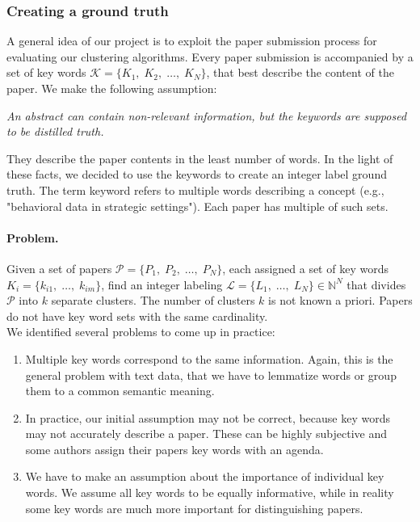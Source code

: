 \subsubsection{Creating a ground truth}
\label{sec:create_gt}
A general idea of our project is to exploit the paper submission process for evaluating our clustering algorithms. Every paper submission is accompanied by a set of key words $ \mathcal{K} = \{ K_{1},\; K_{2},\; \dots ,\; K_{N} \} $, that best describe the content of the paper. We make the following assumption: 
\begin{center}
	\textit{An abstract can contain non-relevant information, but the keywords are supposed to be distilled truth.}
\end{center}
They describe the paper contents in the least number of words. In the light of these facts, we decided to use the keywords to create an integer label ground truth. 
The term keyword refers to multiple words describing a concept (e.g., "behavioral data in strategic settings"). Each paper has multiple of such sets.

\paragraph{Problem.} Given a set of papers $ \mathcal{P} = \{ P_{1},\; P_{2},\; \dots,\; P_{N} \} $, each assigned a set of key words $ K_{i} = \{ k_{i1},\; \dots ,\; k_{im} \} $, find an integer labeling $ \mathcal{L} = \{ L_{1},\; \dots,\; L_{N} \} \in \mathbb{N}^{N} $ that divides $ \mathcal{P} $ into $ k $ separate clusters. The number of clusters $ k $ is not known a priori. Papers do not have key word sets with the same cardinality.\\

We identified several problems to come up in practice: 
\begin{enumerate}
	\item Multiple key words correspond to the same information. Again, this is the general problem with text data, that we have to lemmatize words or group them to a common semantic meaning.
	\item In practice, our initial assumption may not be correct, because key words may not accurately describe a paper. These can be highly subjective and some authors assign their papers key words with an agenda.
	\item We have to make an assumption about the importance of individual key words. We assume all key words to be equally informative, while in reality some key words are much more important for distinguishing papers.
\end{enumerate}

